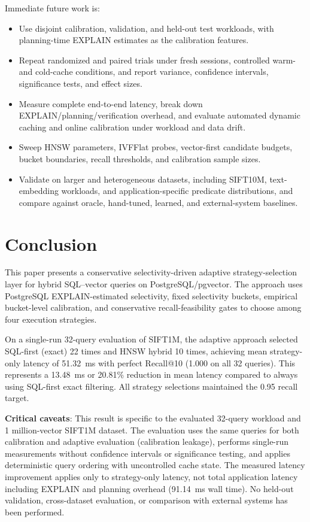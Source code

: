 \documentclass[10pt,twocolumn]{article}
\begin{document}
Immediate future work is:
\begin{itemize}
\item Use disjoint calibration, validation, and held-out test workloads, with planning-time EXPLAIN estimates as the calibration features.
\item Repeat randomized and paired trials under fresh sessions, controlled warm- and cold-cache conditions, and report variance, confidence intervals, significance tests, and effect sizes.
\item Measure complete end-to-end latency, break down EXPLAIN/planning/verification overhead, and evaluate automated dynamic caching and online calibration under workload and data drift.
\item Sweep HNSW parameters, IVFFlat probes, vector-first candidate budgets, bucket boundaries, recall thresholds, and calibration sample sizes.
\item Validate on larger and heterogeneous datasets, including SIFT10M, text-embedding workloads, and application-specific predicate distributions, and compare against oracle, hand-tuned, learned, and external-system baselines.
\end{itemize}

\section{Conclusion}
\label{sec:conclusion}

This paper presents a conservative selectivity-driven adaptive strategy-selection layer for hybrid SQL--vector queries on PostgreSQL/pgvector. The approach uses PostgreSQL EXPLAIN-estimated selectivity, fixed selectivity buckets, empirical bucket-level calibration, and conservative recall-feasibility gates to choose among four execution strategies.

On a single-run 32-query evaluation of SIFT1M, the adaptive approach selected SQL-first (exact) 22 times and HNSW hybrid 10 times, achieving mean strategy-only latency of 51.32~ms with perfect Recall@10 (1.000 on all 32 queries). This represents a 13.48~ms or 20.81\% reduction in mean latency compared to always using SQL-first exact filtering. All strategy selections maintained the 0.95 recall target.

\textbf{Critical caveats}: This result is specific to the evaluated 32-query workload and 1 million-vector SIFT1M dataset. The evaluation uses the same queries for both calibration and adaptive evaluation (calibration leakage), performs single-run measurements without confidence intervals or significance testing, and applies deterministic query ordering with uncontrolled cache state. The measured latency improvement applies only to strategy-only latency, not total application latency including EXPLAIN and planning overhead (91.14~ms wall time). No held-out validation, cross-dataset evaluation, or comparison with external systems has been performed.
\end{document}
